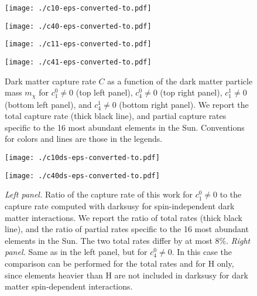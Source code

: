 \documentclass[11pt,a4paper]{article}
\begin{document}
\begin{figure}[t]
\begin{center}
\begin{minipage}[t]{0.49\linewidth}
\centering
\texttt{[image: ./c10-eps-converted-to.pdf]}
\end{minipage}
\begin{minipage}[t]{0.49\linewidth}
\centering
\texttt{[image: ./c40-eps-converted-to.pdf]}
\end{minipage}
\begin{minipage}[t]{0.49\linewidth}
\centering
\texttt{[image: ./c11-eps-converted-to.pdf]}
\end{minipage}
\begin{minipage}[t]{0.49\linewidth}
\centering
\texttt{[image: ./c41-eps-converted-to.pdf]}
\end{minipage}
\end{center}
\caption{Dark matter capture rate $C$ as a function of the dark matter particle mass $m_\chi$ for $c_1^0\neq0$ (top left panel), $c_4^0\neq0$ (top right panel), $c_1^1\neq0$ (bottom left panel), and $c_4^1\neq0$ (bottom right panel). We report the total capture rate (thick black line), and partial capture rates specific to the 16 most abundant elements in the Sun. Conventions for colors and lines are those in the legends. }
\label{fig:c1c4}
\end{figure}
\begin{figure}[t]
\begin{center}
\begin{minipage}[t]{0.49\linewidth}
\centering
\texttt{[image: ./c10ds-eps-converted-to.pdf]}
\end{minipage}
\begin{minipage}[t]{0.48\linewidth}
\centering
\texttt{[image: ./c40ds-eps-converted-to.pdf]}
\end{minipage}
\end{center}
\caption{{\it Left panel.} Ratio of the capture rate of this work for $c_1^0\neq0$ to the capture rate computed with {\sffamily darksusy} for spin-independent dark matter interactions. We report the ratio of total rates (thick black line), and the ratio of partial rates specific to the 16 most abundant elements in the Sun. The two total rates differ by at most 8\%. {\it Right panel.} Same as in the left panel, but for $c_4^0\neq0$. In this case the comparison can be performed for the total rates and for H only, since elements heavier than H are not included in {\sffamily darksusy} for dark matter spin-dependent interactions.}
\label{fig:comp}
\end{figure}
\end{document}
